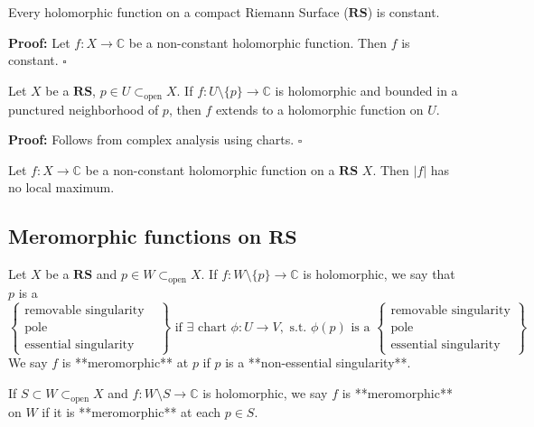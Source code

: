 \documentclass{article}
\begin{document}
\begin{corollary}
Every holomorphic function on a compact Riemann Surface ($\mathbf{RS}$) is constant.
\end{corollary}
\textbf{Proof:}
Let $f: X \to \mathbb{C}$ be a non-constant holomorphic function.
Then $f$ is constant.
\hfill $\square$

\begin{theorem}  \label{thm:2.8}
Let $X$ be a $\mathbf{RS}$, $p \in U \subset_{\text{open}} X$. If $f: U \setminus \{p\} \to \mathbb{C}$ is holomorphic and bounded in a punctured neighborhood of $p$, then $f$ extends to a holomorphic function on $U$.
\end{theorem}
\textbf{Proof:}
Follows from complex analysis using charts.
\hfill $\square$

\begin{theorem}  \label{thm:2.9}
Let $f: X \to \mathbb{C}$ be a non-constant holomorphic function on a $\mathbf{RS}$ $X$.
Then $|f|$ has no local maximum.
\end{theorem}

\subsection{ Meromorphic functions on $\mathbf{RS}$}

\begin{definition}
Let $X$ be a $\mathbf{RS}$ and $p \in W \subset_{\text{open}} X$. If $f: W \setminus \{p\} \to \mathbb{C}$ is holomorphic, we say that $p$ is a
$$
\left\{
\begin{array}{ll}
\text{removable singularity} & \\
\text{pole} &  \\
\text{essential singularity} & 
\end{array}
\right\}
\text{ if } \exists \text{ chart } \phi: U \to V , \text{ s.t. } \phi(p) \text{ is a }
\left\{
\begin{array}{l}
\text{removable singularity} \\
\text{pole} \\
\text{essential singularity}
\end{array}
\right\}
$$
We say $f$ is **meromorphic** at $p$ if $p$ is a **non-essential singularity**.

If $S \subset W \subset_{\text{open}} X$ and $f: W \setminus S \to \mathbb{C}$ is holomorphic, we say $f$ is **meromorphic** on $W$ if it is **meromorphic** at each $p \in S$.
\end{definition}
\end{document}
